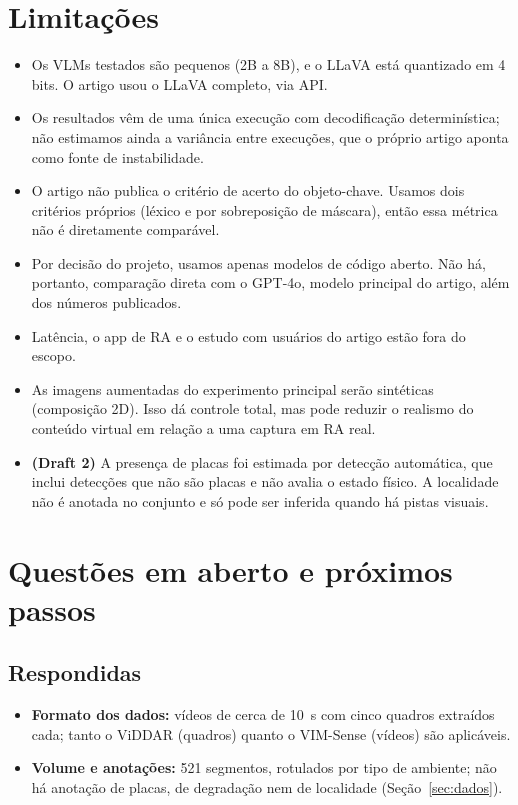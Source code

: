 \documentclass[journal,onecolumn]{IEEEtran}
\begin{document}
\section{Limitações}
\begin{itemize}
\item Os VLMs testados são pequenos (2B a 8B), e o LLaVA está quantizado em 4 bits. O artigo usou o
  LLaVA completo, via API.
\item Os resultados vêm de uma única execução com decodificação determinística; não estimamos ainda a
  variância entre execuções, que o próprio artigo aponta como fonte de instabilidade.
\item O artigo não publica o critério de acerto do objeto-chave. Usamos dois critérios próprios
  (léxico e por sobreposição de máscara), então essa métrica não é diretamente comparável.
\item Por decisão do projeto, usamos apenas modelos de código aberto. Não há, portanto, comparação
  direta com o GPT-4o, modelo principal do artigo, além dos números publicados.
\item Latência, o app de RA e o estudo com usuários do artigo estão fora do escopo.
\item As imagens aumentadas do experimento principal serão sintéticas (composição 2D). Isso dá
  controle total, mas pode reduzir o realismo do conteúdo virtual em relação a uma captura em RA real.
\item \textbf{(Draft 2)} A presença de placas foi estimada por detecção automática, que inclui
  detecções que não são placas e não avalia o estado físico. A localidade não é anotada no conjunto e
  só pode ser inferida quando há pistas visuais.
\end{itemize}

\section{Questões em aberto e próximos passos}
\label{sec:aberto}

\subsection{Respondidas}
\begin{itemize}
\item \textbf{Formato dos dados:} vídeos de cerca de 10~s com cinco quadros extraídos cada; tanto o
  ViDDAR (quadros) quanto o VIM-Sense (vídeos) são aplicáveis.
\item \textbf{Volume e anotações:} 521 segmentos, rotulados por tipo de ambiente; não há anotação de
  placas, de degradação nem de localidade (Seção~\ref{sec:dados}).
\end{itemize}
\end{document}
